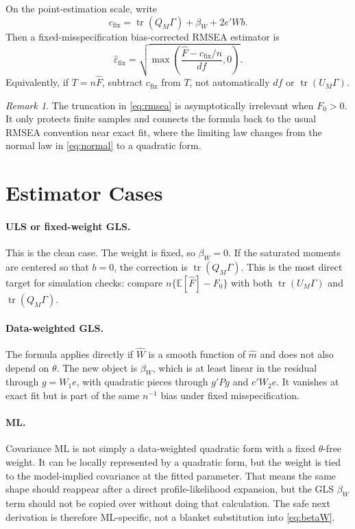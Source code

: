 \documentclass[11pt]{article}
\newcommand{\E}{\mathbb{E}}
\newcommand{\tr}{\operatorname{tr}}
\theoremstyle{plain}
\theoremstyle{remark}
\newtheorem*{remark}{Remark}
\begin{document}
On the point-estimation scale, write
\[
  c_{\mathrm{fix}}
  =
  \tr(Q_M\Gamma)+\beta_W+2e'Wb .
\]
Then a fixed-misspecification bias-corrected RMSEA estimator is
\begin{equation}\label{eq:rmsea}
  \hat\varepsilon_{\mathrm{fix}}
  =
  \sqrt{
    \max\!\left(\frac{\hat F-c_{\mathrm{fix}}/n}{df},0\right)
  } .
\end{equation}
Equivalently, if $T=n\hat F$, subtract $c_{\mathrm{fix}}$ from $T$, not
automatically $df$ or $\tr(U_M\Gamma)$.

\begin{remark}
The truncation in \eqref{eq:rmsea} is asymptotically irrelevant when $F_0>0$.
It only protects finite samples and connects the formula back to the usual
RMSEA convention near exact fit, where the limiting law changes from the normal
law in \eqref{eq:normal} to a quadratic form.
\end{remark}

\section{Estimator Cases}

\paragraph{ULS or fixed-weight GLS.}
This is the clean case. The weight is fixed, so $\beta_W=0$. If the saturated
moments are centered so that $b=0$, the correction is
$\tr(Q_M\Gamma)$. This is the most direct target for simulation checks:
compare $n\{\E[\hat F]-F_0\}$ with both $\tr(U_M\Gamma)$ and
$\tr(Q_M\Gamma)$.

\paragraph{Data-weighted GLS.}
The formula applies directly if $\hat W$ is a smooth function of $\hat m$ and
does not also depend on $\theta$. The new object is $\beta_W$, which is at least
linear in the residual through $g=W_1e$, with quadratic pieces through
$g'Pg$ and $e'W_2e$. It vanishes at exact fit but is part of the same $n^{-1}$
bias under fixed misspecification.

\paragraph{ML.}
Covariance ML is not simply a data-weighted quadratic form with a fixed
$\theta$-free weight. It can be locally represented by a quadratic form, but the
weight is tied to the model-implied covariance at the fitted parameter. That
means the same shape should reappear after a direct profile-likelihood
expansion, but the GLS $\beta_W$ term should not be copied over without doing
that calculation. The safe next derivation is therefore ML-specific, not a
blanket substitution into \eqref{eq:betaW}.
\end{document}
